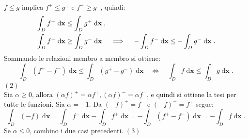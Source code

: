 \documentclass[a4paper,12pt]{report}
\theoremstyle{plain}
\theoremstyle{definition}
\theoremstyle{remark}
\newcommand{\diff}[1]{\mathrm{d}#1}
\numberwithin{equation}{section}
\begin{document}
$f\le g$ implica $f^+\le g^+$ e $f^-\ge g^-$, quindi:
\begin{align}
&\int_D f^+\;\diff{\mathbf{x}}\le \int_D g^+\;\diff{\mathbf{x}}\;, \notag \\
&\int_D f^-\;\diff{\mathbf{x}}\ge \int_D g^-\;\diff{\mathbf{x}}\quad \implies \quad -\int_D f^-\;\diff{\mathbf{x}}\le -\int_D g^-\;\diff{\mathbf{x}}\;.
\end{align}
Sommando le relazioni membro a membro si ottiene:
\begin{equation}
\int_D (f^+-f^-)\;\diff{\mathbf{x}}\le \int_D (g^+-g^-)\;\diff{\mathbf{x}}\quad \Longleftrightarrow\quad  \int_D f\;\diff{\mathbf{x}}\le\int_D g\;\diff{\mathbf{x}}\;.
\end{equation}
\endproof
\proof $(2)$ \\

Sia $\alpha\ge 0$, allora $(\alpha f)^+=\alpha f^+, (\alpha f)^-=\alpha f^-$, e quindi si ottiene la tesi per tutte le funzioni. Sia $
\alpha=-1$. Da $(-f)^+=f^-$ e $(-f)^-=f^+$ segue:
\begin{equation}
\int_D (-f)\;\diff{\mathbf{x}}=\int_D f^-\;\diff{\mathbf{x}}-\int_D f^+\;\diff{\mathbf{x}}=-\int_D (f^+-f^-)\;\diff{\mathbf{x}}=-\int_D f\;\diff{\mathbf{x}}\;.
\end{equation}
Se $\alpha\le 0$, combino i due casi precedenti.
\endproof
\proof $(3)$ \\
\end{document}
